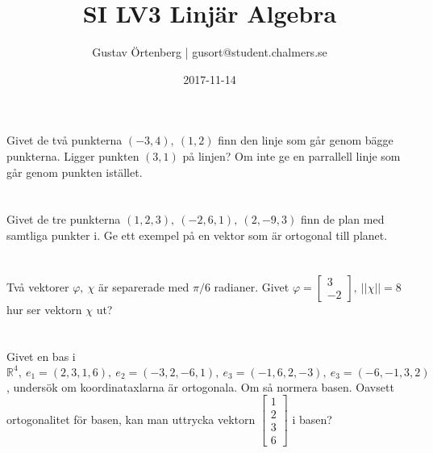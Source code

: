 \documentclass{article}
\title{SI LV3 Linjär Algebra}
\author{Gustav Örtenberg | \small{gusort@student.chalmers.se}}
\date{2017-11-14	}
\begin{document}
\maketitle
\section{}


\section{}


\section{}
Givet de två punkterna $(-3,4),\ (1,2)$ finn den linje som går genom bägge punkterna. Ligger punkten $(3,1)$ på linjen? Om inte ge en parrallell linje som går genom punkten istället. 

\section{}
Givet de tre punkterna $(1,2,3),\ (-2,6,1),\ (2,-9,3)$ finn de plan med samtliga punkter i. Ge ett exempel på en vektor som är ortogonal till planet.

\section{}
Två vektorer $\varphi,\ \chi$ är separerade med $\pi/6$ radianer. Givet $\varphi= \begin{bmatrix}3 \\ -2 \end{bmatrix},\ ||\chi|| = 8$ hur ser vektorn $\chi$ ut?

\section{}
Givet en bas i $\mathbb{R}^4,\ e_1=(2,3,1,6),\ e_2=(-3,2,-6,1),\ e_3=(-1,6,2,-3),\ e_3=(-6,-1,3,2)$, undersök om koordinataxlarna är ortogonala. Om så normera basen. Oavsett ortogonalitet för basen, kan man uttrycka vektorn $\begin{bmatrix}1\\2\\3\\6\end{bmatrix}$ i basen?

\section{}

\end{document}
